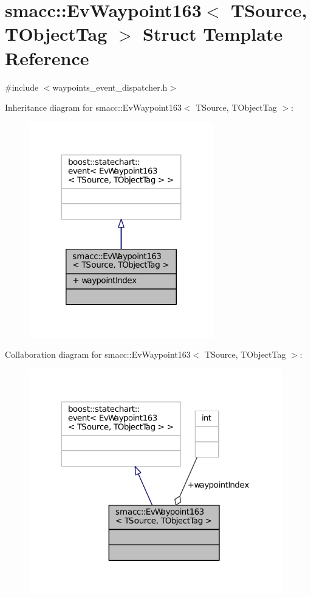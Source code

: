 \hypertarget{structsmacc_1_1EvWaypoint163}{}\section{smacc\+:\+:Ev\+Waypoint163$<$ T\+Source, T\+Object\+Tag $>$ Struct Template Reference}
\label{structsmacc_1_1EvWaypoint163}


{\ttfamily \#include $<$waypoints\+\_\+event\+\_\+dispatcher.\+h$>$}



Inheritance diagram for smacc\+:\+:Ev\+Waypoint163$<$ T\+Source, T\+Object\+Tag $>$\+:
\nopagebreak
\begin{figure}[H]
\begin{center}
\leavevmode
\includegraphics[width=227pt]{structsmacc_1_1EvWaypoint163__inherit__graph}
\end{center}
\end{figure}


Collaboration diagram for smacc\+:\+:Ev\+Waypoint163$<$ T\+Source, T\+Object\+Tag $>$\+:
\nopagebreak
\begin{figure}[H]
\begin{center}
\leavevmode
\includegraphics[width=312pt]{structsmacc_1_1EvWaypoint163__coll__graph}
\end{center}
\end{figure}
